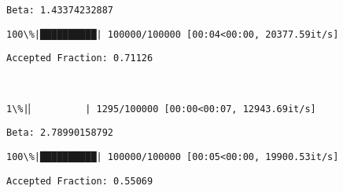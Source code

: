 \documentclass[11pt]{article}
\begin{document}
    \begin{Verbatim}[commandchars=\\\{\}]
Beta: 1.43374232887

    \end{Verbatim}

    \begin{Verbatim}[commandchars=\\\{\}]
100\%|██████████| 100000/100000 [00:04<00:00, 20377.59it/s]

    \end{Verbatim}

    \begin{Verbatim}[commandchars=\\\{\}]
Accepted Fraction: 0.71126

    \end{Verbatim}

    \begin{center}
    \end{center}
    { \hspace*{\fill} \\}
    
    \begin{Verbatim}[commandchars=\\\{\}]
  1\%|▏         | 1295/100000 [00:00<00:07, 12943.69it/s]
    \end{Verbatim}

    \begin{Verbatim}[commandchars=\\\{\}]
Beta: 2.78990158792

    \end{Verbatim}

    \begin{Verbatim}[commandchars=\\\{\}]
100\%|██████████| 100000/100000 [00:05<00:00, 19900.53it/s]

    \end{Verbatim}

    \begin{Verbatim}[commandchars=\\\{\}]
Accepted Fraction: 0.55069

    \end{Verbatim}

    \begin{center}
    \end{center}
    { \hspace*{\fill} \\}
    
\end{document}
